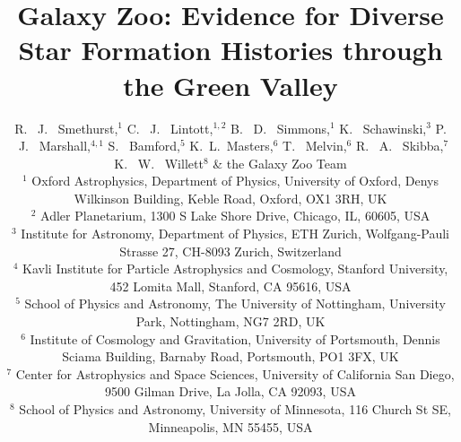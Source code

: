 \documentclass[useAMS,usenatbib]{mn2e}
\begin{document}
\title[The Star Formation History of the Green Valley]{Galaxy Zoo: Evidence for Diverse Star Formation Histories through the Green Valley}
\author[Smethurst et al. 2014]{R. ~J. ~Smethurst,$^1$ C. ~J. ~Lintott,$^{1,2}$ B. ~D. ~Simmons,$^{1}$ K. ~Schawinski,$^{3}$ \newauthor  P. ~J. ~Marshall,$^{4,1}$ S. ~Bamford,$^{5}$ K.~L.~Masters,$^{6}$  T. ~Melvin,$^{6}$ \newauthor R. ~A. ~Skibba,$^{7}$ K. ~W. ~Willett$^{8}$ \& the Galaxy Zoo Team 
\\ $^1$ Oxford Astrophysics, Department of Physics, University of Oxford, Denys Wilkinson Building, Keble Road, Oxford, OX1 3RH, UK 
\\ $^2$ Adler Planetarium, 1300 S Lake Shore Drive, Chicago, IL, 60605, USA 
\\ $^3$ Institute for Astronomy, Department of Physics, ETH Zurich, Wolfgang-Pauli Strasse 27, CH-8093 Zurich, Switzerland 
\\ $^4$ Kavli Institute for Particle Astrophysics and Cosmology, Stanford University, 452 Lomita Mall, Stanford, CA 95616, USA
\\ $^5$ School of Physics and Astronomy, The University of Nottingham, University Park, Nottingham, NG7 2RD, UK
\\ $^6$ Institute of Cosmology and Gravitation, University of Portsmouth, Dennis Sciama Building, Barnaby Road, Portsmouth, PO1 3FX, UK 
\\ $^7$ Center for Astrophysics and Space Sciences, University of California San Diego, 9500 Gilman Drive, La Jolla, CA 92093, USA
\\ $^8$ School of Physics and Astronomy, University of Minnesota, 116 Church St SE, Minneapolis, MN 55455, USA
}

\maketitle
\end{document}
